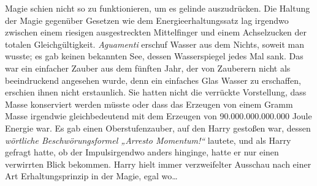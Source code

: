 Magie schien nicht so zu funktionieren, um es gelinde auszudrücken. Die Haltung der Magie gegenüber Gesetzen wie dem Energieerhaltungssatz lag irgendwo zwischen einem riesigen ausgestreckten Mittelfinger und einem Achselzucken der totalen Gleichgültigkeit. \emph{Aguamenti} erschuf Wasser aus dem Nichts, soweit man wusste; es gab keinen bekannten See, dessen Wasserspiegel jedes Mal sank. Das war ein einfacher Zauber aus dem fünften Jahr, der von Zauberern nicht als beeindruckend angesehen wurde, denn ein einfaches Glas Wasser zu erschaffen, erschien ihnen nicht erstaunlich. Sie hatten nicht die verrückte Vorstellung, dass Masse konserviert werden müsste oder dass das Erzeugen von einem Gramm Masse irgendwie gleichbedeutend mit dem Erzeugen von 90.000.000.000.000 Joule Energie war. Es gab einen Oberstufenzauber, auf den Harry gestoßen war, dessen \emph{wörtliche Beschwörungsformel „Arresto Momentum!“} lautete, und als Harry gefragt hatte, ob der Impulsirgendwo anders hinginge, hatte er nur einen verwirrten Blick bekommen. Harry hielt immer verzweifelter Ausschau nach einer Art Erhaltungsprinzip in der Magie, egal wo…

